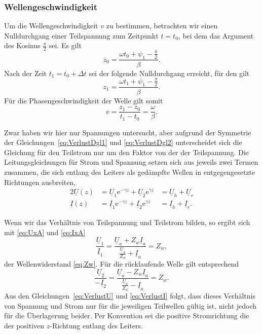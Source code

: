 \documentclass[paper=a4, parskip=half-, ngerman, fontsize=11pt]{scrreprt}
\begin{document}
\subsubsection{Wellengeschwindigkeit}

Um die Wellengeschwindigkeit $v$ zu bestimmen, betrachten wir einen Nulldurchgang einer Teilspannung zum Zeitpunkt
$t=t_{0}$, bei dem das Argument des Kosinus $\frac{\pi}{2}$ sei. Es gilt
\[ z_{0} = \frac{\omega t_{0} + \psi_{1} -\frac{\pi}{2}}{\beta}. \] Nach der Zeit $t_{1} = t_{0} + \Delta t$ sei der
folgende Nulldurchgang erreicht, für den gilt
\[ z_{1} = \frac{\omega t_{1} + \psi_{1} -\frac{\pi}{2}}{\beta}. \] Für die Phasengeschwindigkeit der Welle gilt somit
\[ v = \frac{z_{1} - z_{0}}{t_{1} - t_{0}} = \frac{\omega}{\beta}. \]

Zwar haben wir hier nur Spannungen untersucht, aber aufgrund der Symmetrie der Gleichungen~\eqref{eq:VerlustDgl1} und
\eqref{eq:VerlustDgl2} unterscheidet sich die Gleichung für den Teilstrom nur um den Faktor von der der Teilspannung.
Die Leitungsgleichungen für Strom und Spannung setzen sich aus jeweils zwei Termen zusammen, die sich entlang des
Leiters als gedämpfte Wellen in entgegengesetzte Richtungen ausbreiten,
\begin{alignat*}{2}
\underline{U}(z) &= \underline{U}_{1} \mathrm{e}^{- \gamma z} + \underline{U}_{2} \mathrm{e}^{\gamma z}
&= \underline{U}_{h} + \underline{U}_{r} \\[1ex]
\underline{I}(z) &= \underline{I}_{1} \mathrm{e}^{- \gamma z} + \underline{I}_{2} \mathrm{e}^{\gamma z}
&= \underline{I}_{h} + \underline{I}_{r}.
\end{alignat*}

Wenn wir das Verhältnis von Teilspannung und Teilstrom bilden, so ergibt sich mit \eqref{eq:UxA} und \eqref{eq:IxA}
\[ \frac{\underline{U}_{1}}{\underline{I}_{1}} = \frac{\underline{U}_{a} + Z_{w}
\underline{I}_{a}}{\frac{\underline{U}_{a}}{Z_{w}} + \underline{I}_{a}} = Z_{w}, \]
der Wellenwiderstand \eqref{eq:Zw}. Für die rücklaufende Welle gilt entsprechend
\[ \frac{\underline{U}_{2}}{-\underline{I}_{2}} = \frac{\underline{U}_{a} - Z_{w}
\underline{I}_{a}}{\frac{\underline{U}_{a}}{Z_{w}} - \underline{I}_{a}} = Z_{w}. \]
Aus den Gleichungen~\eqref{eq:VerlustU} und \eqref{eq:VerlustI} folgt, dass dieses Verhältnis von Spannung und Strom
nur für die jeweiligen Teilwellen gültig ist, nicht jedoch für die Überlagerung beider. Per Konvention sei die positive
Stromrichtung die der positiven $z$-Richtung entlang des Leiters.
\end{document}
